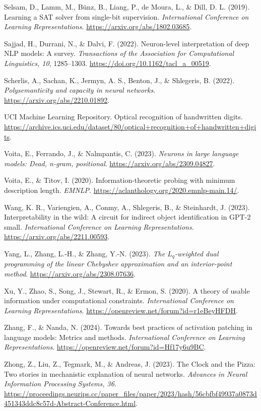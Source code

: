 \documentclass[
  british,
  11pt,
  a4paper,
]{article}
\begin{document}
Selsam, D., Lamm, M., Bünz, B., Liang, P., de Moura, L., \& Dill, D. L.
(2019). Learning a SAT solver from single-bit supervision.
\emph{International Conference on Learning Representations}.
\url{https://arxiv.org/abs/1802.03685}.

Sajjad, H., Durrani, N., \& Dalvi, F. (2022). Neuron-level
interpretation of deep NLP models: A survey. \emph{Transactions of the
Association for Computational Linguistics, 10}, 1285--1303.
\url{https://doi.org/10.1162/tacl_a_00519}.

Scherlis, A., Sachan, K., Jermyn, A. S., Benton, J., \& Shlegeris, B.
(2022). \emph{Polysemanticity and capacity in neural networks}.
\url{https://arxiv.org/abs/2210.01892}.

UCI Machine Learning Repository. Optical recognition of handwritten
digits.
\url{https://archive.ics.uci.edu/dataset/80/optical+recognition+of+handwritten+digits}.

Voita, E., Ferrando, J., \& Nalmpantis, C. (2023). \emph{Neurons in
large language models: Dead, n-gram, positional}.
\url{https://arxiv.org/abs/2309.04827}.

Voita, E., \& Titov, I. (2020). Information-theoretic probing with
minimum description length. \emph{EMNLP}.
\url{https://aclanthology.org/2020.emnlp-main.14/}.

Wang, K. R., Variengien, A., Conmy, A., Shlegeris, B., \& Steinhardt, J.
(2023). Interpretability in the wild: A circuit for indirect object
identification in GPT-2 small. \emph{International Conference on
Learning Representations}. \url{https://arxiv.org/abs/2211.00593}.

Yang, L., Zhang, L.-H., \& Zhang, Y.-N. (2023). \emph{The
\(L_q\)-weighted dual programming of the linear Chebyshev approximation
and an interior-point method}. \url{https://arxiv.org/abs/2308.07636}.

Xu, Y., Zhao, S., Song, J., Stewart, R., \& Ermon, S. (2020). A theory
of usable information under computational constraints.
\emph{International Conference on Learning Representations}.
\url{https://openreview.net/forum?id=r1eBeyHFDH}.

Zhang, F., \& Nanda, N. (2024). Towards best practices of activation
patching in language models: Metrics and methods. \emph{International
Conference on Learning Representations}.
\url{https://openreview.net/forum?id=Hf17y6u9BC}.

Zhong, Z., Liu, Z., Tegmark, M., \& Andreas, J. (2023). The Clock and
the Pizza: Two stories in mechanistic explanation of neural networks.
\emph{Advances in Neural Information Processing Systems, 36}.
\url{https://proceedings.neurips.cc/paper_files/paper/2023/hash/56cbfbf49937a0873d451343ddc8c57d-Abstract-Conference.html}.
\end{document}
